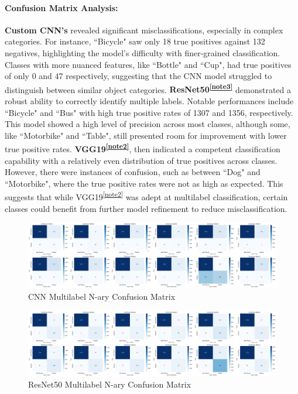 \documentclass{article} %
\begin{document}
\paragraph{Confusion Matrix Analysis:}
\textbf{Custom CNN's} revealed significant misclassifications, especially in complex categories. For instance, ``Bicycle" saw only 18 true positives against 132 negatives, highlighting the model's difficulty with finer-grained classification. Classes with more nuanced features, like ``Bottle" and ``Cup", had true positives of only 0 and 47 respectively, suggesting that the CNN model struggled to distinguish between similar object categories. \textbf{ResNet50\textsuperscript{\ref{note3}}} demonstrated a robust ability to correctly identify multiple labels. Notable performances include ``Bicycle" and ``Bus" with high true positive rates of 1307 and 1356, respectively. This model showed a high level of precision across most classes, although some, like ``Motorbike" and ``Table", still presented room for improvement with lower true positive rates. \textbf{VGG19\textsuperscript{\ref{note2}}}, then indicated a competent classification capability with a relatively even distribution of true positives across classes. However, there were instances of confusion, such as between ``Dog" and ``Motorbike", where the true positive rates were not as high as expected. This suggests that while VGG19\textsuperscript{\ref{note2}} was adept at multilabel classification, certain classes could benefit from further model refinement to reduce misclassification.

\begin{figure}[htbp]
  \centering
  \includegraphics[width=1.0\textwidth]{./figure+object/CNN_labels_BCE.png}
  \caption{CNN Multilabel N-ary Confusion Matrix}
  \label{fig:cnn_cm_mul}
\end{figure}

\begin{figure}[htbp]
  \centering
  \includegraphics[width=1.0\textwidth]{./figure+object/resnet_labels_BCE.png}
  \caption{ResNet50 Multilabel N-ary Confusion Matrix}
  \label{fig:resnet_cm_mul}
\end{figure}
\end{document}

